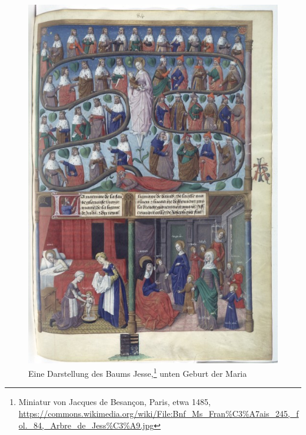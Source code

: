 \documentclass[a4paper]{book}
\begin{document}
\begin{figure}[h]
\begin{center}
\includegraphics[height=30\baselineskip]{Tree_of_Jesse.jpeg}
\caption{Eine Darstellung des Baums Jesse,\footnote{Miniatur von Jacques de Besançon, Paris, etwa 1485, \url{https://commons.wikimedia.org/wiki/File:Bnf_Ms_Fran\%C3\%A7ais_245,_fol._84,_Arbre_de_Jess\%C3\%A9.jpg}} unten Geburt der Maria}
\end{center}
\end{figure}
\end{document}
